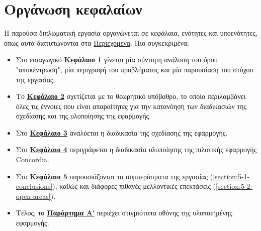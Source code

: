 \section{Οργάνωση κεφαλαίων}\label{section:1-6-document-structure}

Η παρούσα διπλωματική εργασία οργανώνεται σε κεφάλαια, ενότητες και υποενότητες, όπως αυτά διατυπώνονται στα \hyperref[toc]{Περιεχόμενα}. Πιο συγκεκριμένα:

\begin{itemize}
	\item Στο εισαγωγικό \hyperref[chapter:1-introduction]{\textbf{Κεφάλαιο 1}} γίνεται μία σύντομη ανάλυση του όρου "αποκέντρωση", μία περιγραφή του προβλήματος και μία παρουσίαση του στόχου της εργασίας.
	\item Το \hyperref[chapter:2-theoretical-background]{\textbf{Κεφάλαιο 2}} σχετίζεται με το θεωρητικό υπόβαθρο, το οποίο περιλαμβάνει όλες τις έννοιες που είναι απαραίτητες για την κατανόηση των διαδικασιών της σχεδίασης και της υλοποίησης της εφαρμογής.
	\item Στο \hyperref[chapter:3-application-design]{\textbf{Κεφάλαιο 3}} αναλύεται η διαδικασία της σχεδίασης της εφαρμογής.
	\item Στο \hyperref[chapter:4-application-implementation]{\textbf{Κεφάλαιο 4}} περιγράφεται η διαδικασία υλοποίησης της πιλοτικής εφαρμογής Concordia.
	\item Στο \hyperref[chapter:5-conclusions-open-areas]{\textbf{Κεφάλαιο 5}} παρουσιάζονται τα συμπεράσματα της εργασίας (\ref{section:5-1-conclusions}), καθώς και διάφορες πιθανές μελλοντικές επεκτάσεις (\ref{section:5-2-open-areas}).
	\item Τέλος, το \hyperref[{screenshots-appendix}]{\textbf{Παράρτημα Αʹ}} περιέχει στιγμιότυπα οθόνης της υλοποιημένης εφαρμογής.
\end{itemize}
